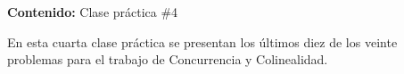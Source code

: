 {\Large
    \textbf{Contenido:} Clase práctica \#4
}

En esta cuarta clase práctica se presentan los últimos diez de los veinte problemas para el trabajo de Concurrencia y Colinealidad.